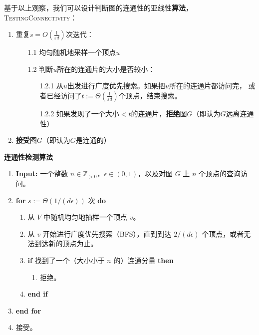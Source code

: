 基于以上观察，我们可以设计判断图的连通性的亚线性\textbf{算法}，\textsc{TestingConnectivity}：
\begin{enumerate}
    \item 重复$s=O(\frac{1}{\varepsilon d})$次迭代：
    \begin{enumerate}
        \item[1.1] 均匀随机地采样一个顶点$u$
        \item[1.2] 判断$u$所在的连通片的大小是否较小：
        \begin{enumerate}
            \item[1.2.1] 从$u$出发进行广度优先搜索。如果把$u$所在的连通片都访问完，
            或者已经访问了$t:=\Theta(\frac{1}{\varepsilon d})$个顶点，结束搜索。
            \item[1.2.2] 如果发现了一个大小$<t$的连通片，\textbf{拒绝}图$G$（即认为$G$远离连通性）
        \end{enumerate}
    \end{enumerate}
    \item \textbf{接受}图$G$（即认为$G$是连通的）
\end{enumerate}

\begin{algorithm}[h]
\caption{\textbf{连通性检测算法}}
	\label{alg-connectivity-test}
\begin{enumerate}
    \item \textbf{Input:} 一个整数 $ n \in \mathbb{Z}_{>0} $，$ \epsilon \in (0, 1) $，以及对图 $ G $ 上 $ n $ 个顶点的查询访问。
    \item \textbf{for} $ s := \Theta(1/(d \epsilon)) $ 次 \textbf{do}
    \begin{enumerate}
        \item 从 $ V $ 中随机均匀地抽样一个顶点 $ v $。
        \item 从 $ v $ 开始进行广度优先搜索（BFS），直到到达 $ 2/(d \epsilon) $ 个顶点，或者无法到达新的顶点为止。
        \item \textbf{if} 找到了一个（大小小于 $ n $ 的）连通分量 \textbf{then}
        \begin{enumerate}
            \item 拒绝。
        \end{enumerate}
        \item \textbf{end if}
    \end{enumerate}
    \item \textbf{end for}
    \item 接受。
\end{enumerate}
\end{algorithm}


